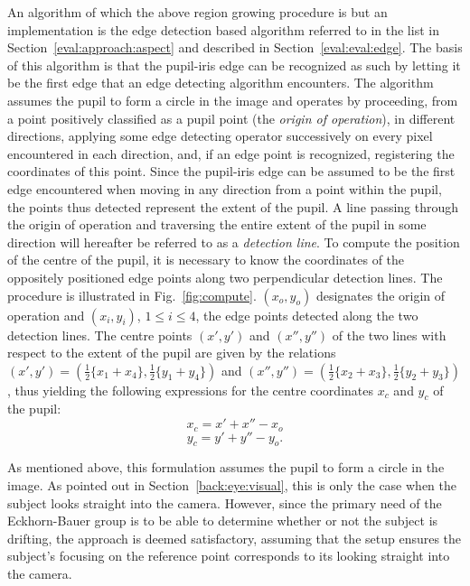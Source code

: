 An algorithm of which the above region growing procedure is but an
implementation is the edge detection based algorithm referred to in
the list in Section~\ref{eval:approach:aspect} and described in
Section~\ref{eval:eval:edge}.  The basis of this algorithm is that the
pupil-iris edge can be recognized as such by letting it be the first
edge that an edge detecting algorithm encounters.  The algorithm
assumes the pupil to form a circle in the image and operates by
proceeding, from a point positively classified as a pupil point (the
{\em origin of operation\/}), in different directions, applying some
edge detecting operator successively on every pixel encountered in
each direction, and, if an edge point is recognized, registering the
coordinates of this point.  Since the pupil-iris edge can be assumed
to be the first edge encountered when moving in any direction from a
point within the pupil, the points thus detected represent the extent
of the pupil.  A line passing through the origin of operation and
traversing the entire extent of the pupil in some direction will
hereafter be referred to as a {\em detection line\/}.  To compute the
position of the centre of the pupil, it is necessary to know the
coordinates of the oppositely positioned edge points along two
perpendicular detection lines.  The procedure is illustrated in
Fig.~\ref{fig:compute}.  $(x_{o},y_{o})$ designates the origin of
operation and $(x_{i},y_{i})$, $1\leq i\leq 4$, the edge points
detected along the two detection lines.  The centre points $(x',y')$
and $(x'',y'')$ of the two lines with respect to the extent of the
pupil are given by the relations
$(x',y')=(\frac{1}{2}\{x_{1}+x_{4}\},\frac{1}{2}\{y_{1}+y_{4}\})$ and
$(x'',y'')=(\frac{1}{2}\{x_{2}+x_{3}\},\frac{1}{2}\{y_{2}+y_{3}\})$,
thus yielding the following expressions for the centre coordinates
$x_{c}$ and $y_{c}$ of the pupil:
\begin{equation}
\label{eq:centre:x}
  x_{c}=x'+x''-x_{o}
\end{equation}
\begin{equation}
\label{eq:centre:y}
  y_{c}=y'+y''-y_{o}\mbox{.}
\end{equation}

As mentioned above, this formulation assumes the pupil to form a
circle in the image.  As pointed out in Section~\ref{back:eye:visual},
this is only the case when the subject looks straight into the camera.
However, since the primary need of the Eckhorn-Bauer group is to be
able to determine whether or not the subject is drifting, the approach
is deemed satisfactory, assuming that the setup ensures the subject's
focusing on the reference point corresponds to its looking straight
into the camera.

